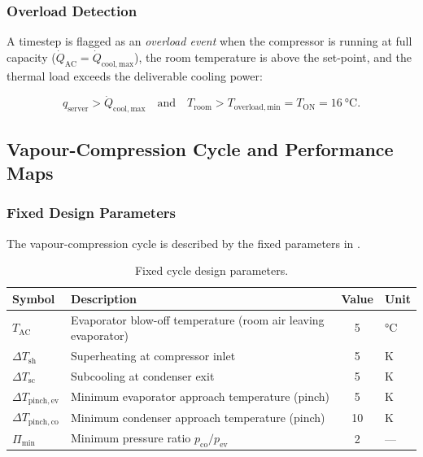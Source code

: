 \documentclass[12pt, a4paper]{article}
\newcommand{\Qdot}{\dot{Q}}
\newcommand{\Troom}{T_{\mathrm{room}}}
\newcommand{\TAC}{T_{\mathrm{AC}}}
\newcommand{\dTpin}[1]{\Delta T_{\mathrm{pinch,#1}}}
\newcommand{\dTsh}{\Delta T_{\mathrm{sh}}}
\newcommand{\dTsc}{\Delta T_{\mathrm{sc}}}
\begin{document}
\subsubsection{Overload Detection}

A timestep is flagged as an \emph{overload event} when the compressor is running at full
capacity ($\Qdot_{\mathrm{AC}} = \Qdot_{\mathrm{cool,max}}$), the room temperature is above
the set-point, and the thermal load exceeds the deliverable cooling power:

\begin{equation}
  q_{\mathrm{server}} > \Qdot_{\mathrm{cool,max}}
  \quad\text{and}\quad
  \Troom > T_{\mathrm{overload,min}} = T_{\mathrm{ON}} = \SI{16}{\degreeCelsius}.
  \label{eq:overload}
\end{equation}

\subsection{Vapour-Compression Cycle and Performance Maps}
\label{sec:cycle}

\subsubsection{Fixed Design Parameters}

The vapour-compression cycle is described by the fixed parameters in
.

\begin{table}[H]
\centering
\caption{Fixed cycle design parameters.}
\label{tab:fixed_params}
\begin{tabular}{llSl}
\toprule
Symbol & Description & {Value} & Unit \\
\midrule
$\TAC$         & Evaporator blow-off temperature (room air leaving evaporator) & 5  & \si{\degreeCelsius} \\
$\dTsh$        & Superheating at compressor inlet                             & 5  & \si{K} \\
$\dTsc$        & Subcooling at condenser exit                                 & 5  & \si{K} \\
$\dTpin{ev}$   & Minimum evaporator approach temperature (pinch)               & 5  & \si{K} \\
$\dTpin{co}$   & Minimum condenser approach temperature (pinch)                & 10 & \si{K} \\
$\Pi_{\min}$   & Minimum pressure ratio $p_{\mathrm{co}}/p_{\mathrm{ev}}$     & 2  & --- \\
\bottomrule
\end{tabular}
\end{table}
\end{document}
